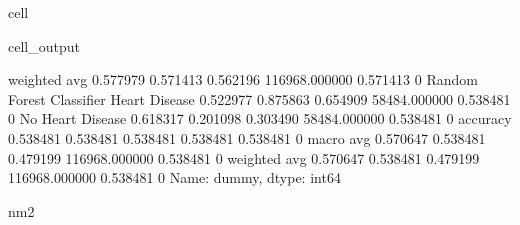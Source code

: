 \documentclass[letterpaper,10pt,english]{jupyterBook}
\begin{document}
\begin{sphinxuseclass}{cell}
\begin{sphinxVerbatimOutput}
\begin{sphinxuseclass}{cell_output}
\begin{sphinxVerbatim}[commandchars=\\\{\}]
                           weighted avg      0.577979   0.571413  0.562196  116968.000000  0.571413    0
Random Forest Classifier   Heart Disease     0.522977   0.875863  0.654909  58484.000000   0.538481    0
                           No Heart Disease  0.618317   0.201098  0.303490  58484.000000   0.538481    0
                           accuracy          0.538481   0.538481  0.538481  0.538481       0.538481    0
                           macro avg         0.570647   0.538481  0.479199  116968.000000  0.538481    0
                           weighted avg      0.570647   0.538481  0.479199  116968.000000  0.538481    0
Name: dummy, dtype: int64

nm2
\PYGZhy{}\PYGZhy{}\PYGZhy{}\PYGZhy{}\PYGZhy{}\PYGZhy{}\PYGZhy{}\PYGZhy{}\PYGZhy{}\PYGZhy{}\PYGZhy{}\PYGZhy{}\PYGZhy{}\PYGZhy{}\PYGZhy{}\PYGZhy{}\PYGZhy{}\PYGZhy{}\PYGZhy{}
\end{sphinxVerbatim}


\end{sphinxuseclass}
\end{sphinxVerbatimOutput}
\end{sphinxuseclass}
\end{document}
